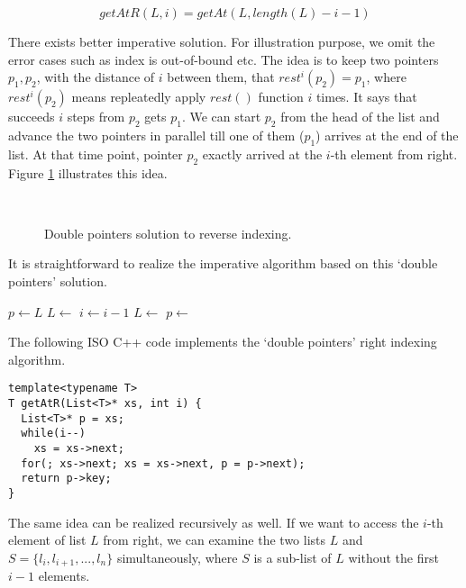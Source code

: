 \documentclass[b5paper]{article}
\begin{document}
\[
  getAtR(L, i) = getAt(L, length(L) - i -1)
\]

There exists better imperative solution. For illustration purpose, we omit the error cases such
as index is out-of-bound etc. The idea is to keep two pointers $p_1, p_2$, with the distance
of $i$ between them, that $rest^i(p_2) = p_1$, where $rest^i(p_2)$ means repleatedly apply $rest()$ function
$i$ times. It says that succeeds $i$ steps from $p_2$ gets $p_1$. We can start $p_2$ from the head
of the list and advance the two pointers in parallel till one of them ($p_1$) arrives at the end
of the list. At that time point, pointer $p_2$ exactly arrived at the $i$-th element from right.
Figure \ref{fig:list-rindex} illustrates this idea.

\begin{figure}[htbp]
    \centering
     \\
    \caption{Double pointers solution to reverse indexing.} \label{fig:list-rindex}
\end{figure}

It is straightforward to realize the imperative algorithm based on this `double pointers' solution.

\begin{algorithmic}[1]
  \State $p \gets L$
    \State $L \gets $ 
    \State $i \gets i - 1$
  \EndWhile
    \State $L \gets$ 
    \State $p \gets$ 
  \EndWhile
  \State \Return {}
\EndFunction
\end{algorithmic}

The following ISO C++ code implements the `double pointers' right indexing algorithm.

\lstset{language=C++}
\begin{lstlisting}
template<typename T>
T getAtR(List<T>* xs, int i) {
  List<T>* p = xs;
  while(i--)
    xs = xs->next;
  for(; xs->next; xs = xs->next, p = p->next);
  return p->key;
}
\end{lstlisting}

The same idea can be realized recursively as well. If we want to access the $i$-th element of list $L$ from right, we
can examine the two lists $L$ and $S=\{l_i, l_{i+1}, ..., l_n\}$ simultaneously, where $S$ is a sub-list
of $L$ without the first $i-1$ elements.
\end{document}
